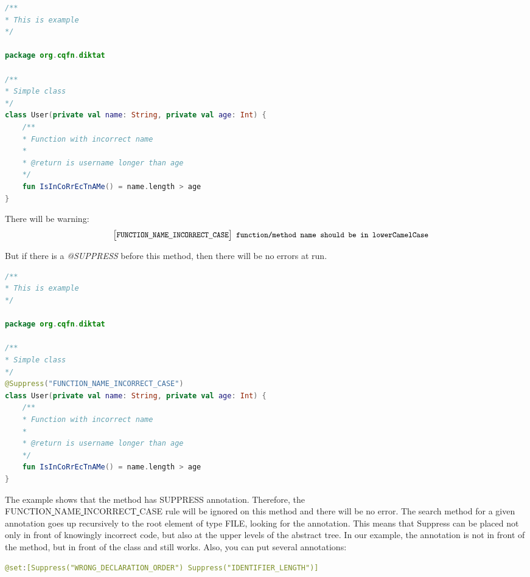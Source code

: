 \begin{lstlisting}[caption={Function with incorrect name.}, label={lst:example1}, language=Kotlin]
	/**
* This is example
*/

package org.cqfn.diktat

/**
* Simple class
*/
class User(private val name: String, private val age: Int) {
	/**
	* Function with incorrect name
	* 
	* @return is username longer than age
	*/
	fun IsInCoRrEcTnAMe() = name.length > age
}

\end{lstlisting}

There will be warning: 
$$
\texttt{ \small{ $\big[$FUNCTION\underline{ }NAME\underline{ }INCORRECT\underline{ }CASE$\big]$  function/method name should be in lowerCamelCase}}
$$

But if there is a \textsl{@SUPPRESS} before this method, then there will be no errors at run.
\begin{lstlisting}[caption={Function with incorrect name, but with suppress.}, label={lst:example1}, language=Kotlin]
	/**
* This is example
*/

package org.cqfn.diktat

/**
* Simple class
*/
@Suppress("FUNCTION_NAME_INCORRECT_CASE")
class User(private val name: String, private val age: Int) {
	/**
	* Function with incorrect name
	* 
	* @return is username longer than age
	*/
	fun IsInCoRrEcTnAMe() = name.length > age
}

\end{lstlisting}

The example shows that the method has SUPPRESS annotation. Therefore, the \\ FUNCTION\underline{ }NAME\underline{ }INCORRECT\underline{ }CASE rule will be ignored on this method and there will be no error. The search method for a given annotation goes up recursively to the root element of type FILE, looking for the annotation. This means that Suppress can be placed not only in front of knowingly incorrect code, but also at the upper levels of the abstract tree. In our example, the annotation is not in front of the method, but in front of the class and still works. Also, you can put several annotations:
\begin{lstlisting}[caption={Function with incorrect name, but with suppress.}, label={lst:example1}, language=Kotlin]
@set:[Suppress("WRONG_DECLARATION_ORDER") Suppress("IDENTIFIER_LENGTH")]
\end{lstlisting}

